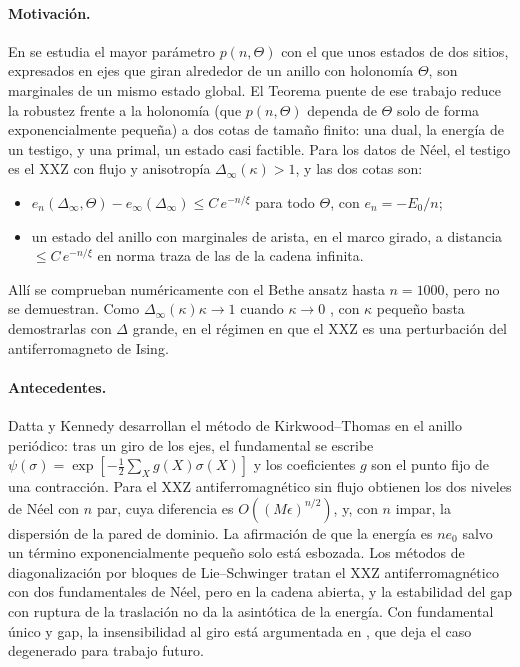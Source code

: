 \documentclass[11pt,a4paper]{article}
\theoremstyle{remark}
\begin{document}
\paragraph{Motivación.} En \cite{robustez} se estudia el mayor parámetro $p(n,\Theta)$ con el
que unos estados de dos sitios, expresados en ejes que giran alrededor de un anillo con holonomía
$\Theta$, son marginales de un mismo estado global. El Teorema puente de ese trabajo reduce la
robustez frente a la holonomía (que $p(n,\Theta)$ dependa de $\Theta$ solo de forma exponencialmente
pequeña) a dos cotas de tamaño finito: una dual, la energía de un testigo, y una primal, un estado
casi factible. Para los datos de Néel, el testigo es el XXZ con flujo y anisotropía
$\Delta_\infty(\kappa)>1$, y las dos cotas son:
\begin{itemize}
\item[(E)] $e_n(\Delta_\infty,\Theta)-e_\infty(\Delta_\infty)\le C\,e^{-n/\xi}$ para todo $\Theta$, con
  $e_n=-E_0/n$;
\item[(M)] un estado del anillo con marginales de arista, en el marco girado, a distancia
  $\le C\,e^{-n/\xi}$ en norma traza de las de la cadena infinita.
\end{itemize}
Allí se comprueban numéricamente con el Bethe ansatz hasta $n=1000$, pero no se demuestran. Como
$\Delta_\infty(\kappa)\kappa\to1$ cuando $\kappa\to0$ \cite[Prop.~17(vi)]{robustez}, con $\kappa$
pequeño basta demostrarlas con $\Delta$ grande, en el régimen en que el XXZ es una perturbación del
antiferromagneto de Ising.

\paragraph{Antecedentes.} Datta y Kennedy \cite{dk-quasi,dk-kink} desarrollan el método de
Kirkwood--Thomas \cite{kt} en el anillo periódico: tras un giro de los ejes, el fundamental se
escribe $\psi(\sigma)=\exp[-\tfrac12\sum_Xg(X)\sigma(X)]$ y los coeficientes $g$ son el punto fijo de
una contracción. Para el XXZ antiferromagnético sin flujo obtienen los dos niveles de Néel con $n$ par,
cuya diferencia es $O((M\epsilon)^{n/2})$, y, con $n$ impar, la dispersión de la pared de dominio. La
afirmación de que la energía es $n e_0$ salvo un término exponencialmente pequeño solo está
esbozada. Los métodos de diagonalización por bloques de Lie--Schwinger \cite{dfpr} tratan el XXZ
antiferromagnético con dos fundamentales de Néel, pero en la cadena abierta, y la estabilidad del
gap con ruptura de la traslación \cite{nsy} no da la asintótica de la energía. Con fundamental
único y gap, la insensibilidad al giro está argumentada en \cite{watanabe}, que deja el caso
degenerado para trabajo futuro.
\end{document}
